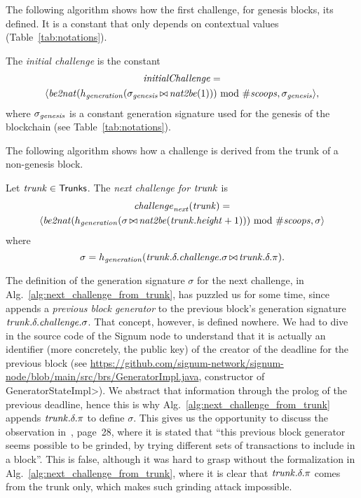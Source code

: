 The following algorithm shows how the first challenge, for genesis blocks,
its defined. It is a constant that only depends on contextual values (Table~\ref{tab:notations}).
%
\begin{alg}[$\initialchallenge$]\label{alg:initial_challenge}
  The \emph{initial challenge} is the constant
  \begin{multline*}
    {\mathit{initialChallenge}}=\\
    \langle{\mathit{be2nat}}(h_{\mathit{generation}}(\sigma_{\mathit{genesis}}\operatorname*{\bowtie}{\mathit{nat2be}}(1)))\text{ mod }{\#\mathit{scoops}},\sigma_{\mathit{genesis}}\rangle,
  \end{multline*}
  where $\sigma_{\mathit{genesis}}$ is a constant generation signature used for the genesis of the blockchain
  (see Table~\ref{tab:notations}).
\end{alg}
%
The following algorithm shows how a challenge is derived from the trunk of a non-genesis block.
%
\begin{alg}[$\nextchallenge(\trunk)$]\label{alg:next_challenge_from_trunk}
  Let ${\mathit{trunk}}\in{\mathsf{Trunks}}$. The \emph{next challenge for ${\mathit{trunk}}$} is
  \begin{multline*}
    {\mathit{challenge}}_{\mathit{next}}({\mathit{trunk}})=\\
    \langle{\mathit{be2nat}}(h_{\mathit{generation}}(\sigma\operatorname*{\bowtie}{\mathit{nat2be}}({\mathit{trunk}}.{\mathit{height}}+1)))\text{ mod }{\#\mathit{scoops}},\sigma\rangle
  \end{multline*}
  where
  \[
  \sigma=h_{\mathit{generation}}({\mathit{trunk}}.\delta.{\mathit{challenge}}.\sigma\operatorname*{\bowtie}{\mathit{trunk}}.\delta.\pi).  
  \]
\end{alg}
%
The definition of the generation signature $\sigma$ for the next challenge,
in Alg.~\ref{alg:next_challenge_from_trunk},
has puzzled us for some time, since~\cite{SignumPlotting} appends a \emph{previous block generator}
to the previous block's generation signature ${\mathit{trunk}}.\delta.{\mathit{challenge}}.\sigma$.
That concept, however, is defined nowhere.
We had to dive in the source code of the Signum node
to understand that it is actually
an identifier (more concretely, the public key)
of the creator of the deadline for the previous block
(see \url{https://github.com/signum-network/signum-node/blob/main/src/brs/GeneratorImpl.java}, constructor of \<GeneratorStateImpl>).
We abstract that information through the prolog of the previous deadline, hence this is why
Alg.~\ref{alg:next_challenge_from_trunk} appends
${\mathit{trunk}}.\delta.\pi$ to define $\sigma$.
This gives us the opportunity to discuss the observation in~\cite{ParkPAFG15}, page~28,
where it is stated that ``this previous block generator seems possible to be grinded, by trying
different sets of transactions to include in a block''. This is false, although it was
hard to grasp without the formalization in
Alg.~\ref{alg:next_challenge_from_trunk}, where it is clear that
${\mathit{trunk}}.\delta.\pi$ comes from the trunk only, which makes
such grinding attack impossible.

